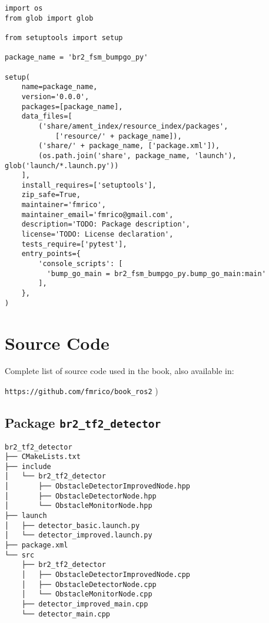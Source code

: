  \footnotesize
\begin{tcolorbox}[sharp corners, colframe=gray!80, colback=LightGray, left=0pt, top=0pt, bottom=0pt, title=\texttt{br2\_fsm\_bumpgo\_py/setup.py}]
  \begin{verbatim}
import os
from glob import glob

from setuptools import setup

package_name = 'br2_fsm_bumpgo_py'

setup(
    name=package_name,
    version='0.0.0',
    packages=[package_name],
    data_files=[
        ('share/ament_index/resource_index/packages',
            ['resource/' + package_name]),
        ('share/' + package_name, ['package.xml']),
        (os.path.join('share', package_name, 'launch'), glob('launch/*.launch.py'))
    ],
    install_requires=['setuptools'],
    zip_safe=True,
    maintainer='fmrico',
    maintainer_email='fmrico@gmail.com',
    description='TODO: Package description',
    license='TODO: License declaration',
    tests_require=['pytest'],
    entry_points={
        'console_scripts': [
          'bump_go_main = br2_fsm_bumpgo_py.bump_go_main:main'
        ],
    },
)
    \end{verbatim}
    \end{tcolorbox}
  \normalsize



\appendix

\chapter[Source Code]{Source Code}
\label{cap:source}
Complete list of source code used in the book, also available in:

\vspace{0.5cm}
\large
\texttt{https://github.com/fmrico/book\_ros2}
\normalsize
)
\section{Package \texttt{br2\_tf2\_detector}}
\label{sec:anex:br2_tf2_detector}

 \footnotesize
\begin{tcolorbox}[sharp corners, colframe=gray!80, colback=LightGray, left=0pt, top=0pt, bottom=0pt, title=Package \texttt{br2\_tf2\_detector}]
  \begin{verbatim}
br2_tf2_detector
├── CMakeLists.txt
├── include
│   └── br2_tf2_detector
│       ├── ObstacleDetectorImprovedNode.hpp
│       ├── ObstacleDetectorNode.hpp
│       └── ObstacleMonitorNode.hpp
├── launch
│   ├── detector_basic.launch.py
│   └── detector_improved.launch.py
├── package.xml
└── src
    ├── br2_tf2_detector
    │   ├── ObstacleDetectorImprovedNode.cpp
    │   ├── ObstacleDetectorNode.cpp
    │   └── ObstacleMonitorNode.cpp
    ├── detector_improved_main.cpp
    └── detector_main.cpp    \end{verbatim}
    \end{tcolorbox}
  \normalsize

